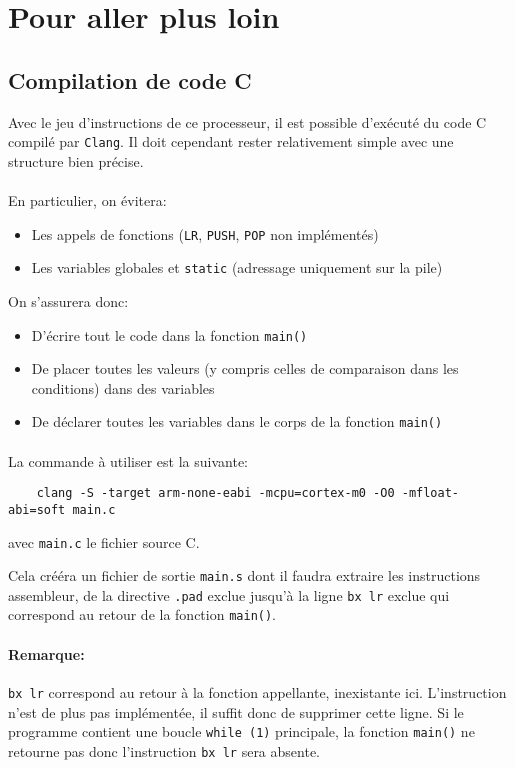 \section{Pour aller plus loin}
\subsection{Compilation de code C}
Avec le jeu d'instructions de ce processeur, il est possible d'exécuté du code C compilé par \texttt{Clang}.
Il doit cependant rester relativement simple avec une structure bien précise.

\paragraph{}
En particulier, on évitera:
\begin{itemize}
	\item Les appels de fonctions (\texttt{LR}, \texttt{PUSH}, \texttt{POP} non implémentés)
	\item Les variables globales et \texttt{static} (adressage uniquement sur la pile)
\end{itemize}

On s'assurera donc:
\begin{itemize}
	\item D'écrire tout le code dans la fonction \texttt{main()}
	\item De placer toutes les valeurs (y compris celles de comparaison dans les conditions) dans des variables
	\item De déclarer toutes les variables dans le corps de la fonction \texttt{main()}
\end{itemize}

\paragraph{}
La commande à utiliser est la suivante:
\begin{lstlisting}
	clang -S -target arm-none-eabi -mcpu=cortex-m0 -O0 -mfloat-abi=soft main.c
\end{lstlisting}
avec \texttt{main.c} le fichier source C.

Cela crééra un fichier de sortie \texttt{main.s} dont il faudra extraire les instructions assembleur, 
de la directive \texttt{.pad} exclue jusqu'à la ligne \texttt{bx lr} exclue qui correspond au retour de la fonction \texttt{main()}.

\paragraph{Remarque:} \texttt{bx lr} correspond au retour à la fonction appellante, inexistante ici.
L'instruction n'est de plus pas implémentée, il suffit donc de supprimer cette ligne.
Si le programme contient une boucle \texttt{while (1)} principale, la fonction \texttt{main()} ne retourne pas donc l'instruction \texttt{bx lr} sera absente.

